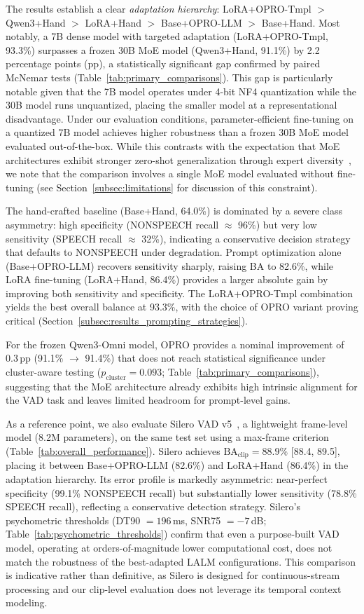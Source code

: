 \documentclass[11pt,a4paper]{article}
\begin{document}
The results establish a clear \emph{adaptation hierarchy}: LoRA+OPRO-Tmpl $>$ Qwen3+Hand $>$ LoRA+Hand $>$ Base+OPRO-LLM $>$ Base+Hand. Most notably, a 7B dense model with targeted adaptation (LoRA+OPRO-Tmpl, 93.3\%) surpasses a frozen 30B MoE model (Qwen3+Hand, 91.1\%) by 2.2 percentage points (pp), a statistically significant gap confirmed by paired McNemar tests (Table~\ref{tab:primary_comparisons}). This gap is particularly notable given that the 7B model operates under 4-bit NF4 quantization while the 30B model runs unquantized, placing the smaller model at a representational disadvantage. Under our evaluation conditions, parameter-efficient fine-tuning on a quantized 7B model achieves higher robustness than a frozen 30B MoE model evaluated out-of-the-box. While this contrasts with the expectation that MoE architectures exhibit stronger zero-shot generalization through expert diversity~\cite{hu2024large}, we note that the comparison involves a single MoE model evaluated without fine-tuning (see Section~\ref{subsec:limitations} for discussion of this constraint).

The hand-crafted baseline (Base+Hand, 64.0\%) is dominated by a severe class asymmetry: high specificity (NONSPEECH recall $\approx$ 96\%) but very low sensitivity (SPEECH recall $\approx$ 32\%), indicating a conservative decision strategy that defaults to NONSPEECH under degradation. Prompt optimization alone (Base+OPRO-LLM) recovers sensitivity sharply, raising BA to 82.6\%, while LoRA fine-tuning (LoRA+Hand, 86.4\%) provides a larger absolute gain by improving both sensitivity and specificity. The LoRA+OPRO-Tmpl combination yields the best overall balance at 93.3\%, with the choice of OPRO variant proving critical (Section~\ref{subsec:results_prompting_strategies}).

For the frozen Qwen3-Omni model, OPRO provides a nominal improvement of 0.3\,pp (91.1\% $\rightarrow$ 91.4\%) that does not reach statistical significance under cluster-aware testing ($p_{\mathrm{cluster}} = 0.093$; Table~\ref{tab:primary_comparisons}), suggesting that the MoE architecture already exhibits high intrinsic alignment for the VAD task and leaves limited headroom for prompt-level gains.

As a reference point, we also evaluate Silero VAD v5~\cite{silero_vad_github}, a lightweight frame-level model (8.2M parameters), on the same test set using a max-frame criterion (Table~\ref{tab:overall_performance}). Silero achieves $\text{BA}_{\text{clip}} = 88.9\%$ [88.4, 89.5], placing it between Base+OPRO-LLM (82.6\%) and LoRA+Hand (86.4\%) in the adaptation hierarchy. Its error profile is markedly asymmetric: near-perfect specificity (99.1\% NONSPEECH recall) but substantially lower sensitivity (78.8\% SPEECH recall), reflecting a conservative detection strategy. Silero's psychometric thresholds (DT90 $= 196$\,ms, SNR75 $= -7$\,dB; Table~\ref{tab:psychometric_thresholds}) confirm that even a purpose-built VAD model, operating at orders-of-magnitude lower computational cost, does not match the robustness of the best-adapted LALM configurations. This comparison is indicative rather than definitive, as Silero is designed for continuous-stream processing and our clip-level evaluation does not leverage its temporal context modeling.
\end{document}

